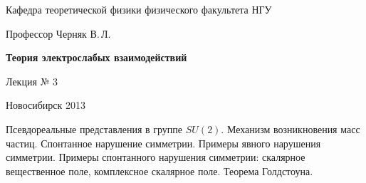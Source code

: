 \documentclass[12pt,pagesize,paper=landscape,paper=192mm:108mm]{scrbook}
\begin{document}
\begin{titlepage}
\begin{center}
    Кафедра теоретической физики физического факультета НГУ
    \medskip

    \Large
    Профессор Черняк В.\,Л.
    \bigskip

    \huge
    \textbf{Теория электрослабых взаимодействий}
    \bigskip

    \Large
    Лекция № 3
    \vfill

    \vfill

    \normalsize    Новосибирск 2013
    \smallskip
    
    \ccbysa
  \end{center}
\end{titlepage}
\newpage

\vspace*{-1em}
\begin{center}
  \vfill
  \begin{minipage}{0.66\linewidth}
    Псевдореальные представления в группе $SU(2)$. Механизм
    возникновения масс частиц.  Спонтанное нарушение
    симметрии. Примеры явного нарушения симметрии.  Примеры
    спонтанного нарушения симметрии: скалярное вещественное поле,
    комплексное скалярное поле. Теорема Голдстоуна.
  \end{minipage}
  \vfill
\end{center}
\end{document}
